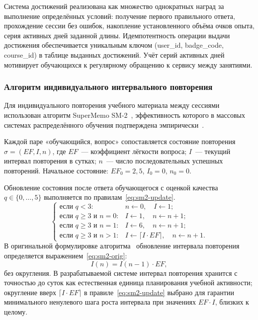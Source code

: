 Система достижений реализована как множество однократных наград
за выполнение определённых условий: получение первого правильного
ответа, прохождение сессии без ошибок, накопление установленного
объёма очков опыта, серия активных дней заданной длины.
Идемпотентность операции выдачи достижения обеспечивается
уникальным ключом (user\_id, badge\_code, course\_id)
в таблице выданных достижений. Учёт серий активных дней мотивирует
обучающихся к регулярному обращению к сервису между занятиями.

\subsubsection{Алгоритм индивидуального интервального повторения}

Для индивидуального повторения учебного материала между сессиями
использован алгоритм SuperMemo SM-2~\cite{wozniak1990}, эффективность
которого в массовых системах распределённого обучения подтверждена
эмпирически~\cite{alyshova2022}.

Каждой паре «обучающийся, вопрос» сопоставляется состояние повторения
$\sigma = (EF, I, n)$, где $EF$~--- коэффициент лёгкости вопроса;
$I$~--- текущий интервал повторения в сутках; $n$~--- число
последовательных успешных повторений. Начальное состояние:
$EF_0 = 2{,}5$, $I_0 = 0$, $n_0 = 0$.

Обновление состояния после ответа обучающегося с оценкой качества
$q \in \{0, \ldots, 5\}$ выполняется по правилам~\eqref{eq:sm2-update}.
\begin{equation}\label{eq:sm2-update}
    \begin{cases}
        \text{если } q < 3: & n \leftarrow 0, \quad I \leftarrow 1; \\
        \text{если } q \geq 3 \text{ и } n = 0: & I \leftarrow 1, \quad n \leftarrow n + 1; \\
        \text{если } q \geq 3 \text{ и } n = 1: & I \leftarrow 6, \quad n \leftarrow n + 1; \\
        \text{если } q \geq 3 \text{ и } n > 1: & I \leftarrow \lceil I \cdot EF \rceil, \quad n \leftarrow n + 1.
    \end{cases}
\end{equation}
В оригинальной формулировке алгоритма~\cite{wozniak1990} обновление
интервала повторения определяется выражением~\eqref{eq:sm2-orig}:
\begin{equation}\label{eq:sm2-orig}
    I(n) = I(n-1) \cdot EF,
\end{equation}
без округления. В разрабатываемой системе интервал повторения
хранится с точностью до суток как естественная единица планирования
учебной активности; округление вверх $\lceil I \cdot EF \rceil$
в правиле~\eqref{eq:sm2-update} выбрано для гарантии минимального
ненулевого шага роста интервала при значениях $EF \cdot I$,
близких к целому.

